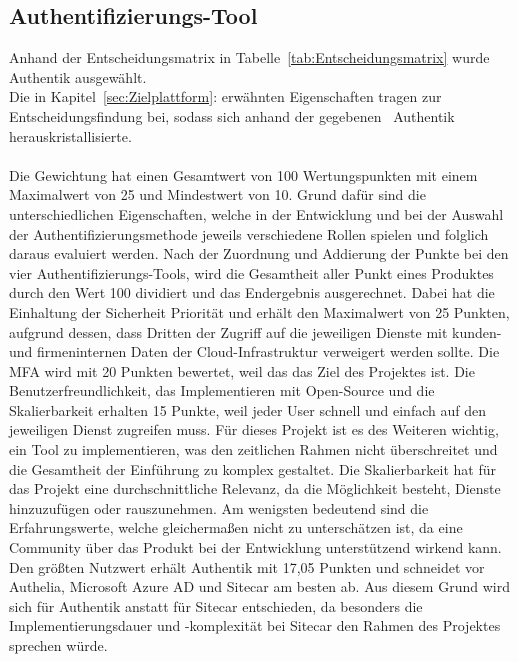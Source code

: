 \subsection{Authentifizierungs-Tool}
\label{sec:Authentifizierungs-Tool}
Anhand der Entscheidungsmatrix in Tabelle~\ref{tab:Entscheidungsmatrix} wurde Authentik ausgewählt. 
\\Die in Kapitel~\ref{sec:Zielplattform}:  erwähnten Eigenschaften tragen zur Entscheidungsfindung bei, sodass 
sich anhand der gegebenen~ Authentik herauskristallisierte.
\\
\\Die Gewichtung hat einen Gesamtwert von 100 Wertungspunkten mit einem Maximalwert von 25 und Mindestwert von 10. Grund dafür sind die 
unterschiedlichen Eigenschaften, welche in der Entwicklung und bei der Auswahl der Authentifizierungsmethode jeweils verschiedene Rollen 
spielen und folglich daraus evaluiert werden. Nach der Zuordnung und Addierung der Punkte bei den vier Authentifizierungs-Tools, 
wird die Gesamtheit aller Punkt eines Produktes durch den Wert 100 dividiert und das Endergebnis ausgerechnet. 
Dabei hat die Einhaltung der Sicherheit Priorität und erhält den Maximalwert von 25 Punkten, aufgrund dessen, dass Dritten der Zugriff 
auf die jeweiligen Dienste mit kunden- und firmeninternen Daten der Cloud-Infrastruktur verweigert werden sollte. 
Die MFA wird mit 20 Punkten bewertet, weil das das Ziel des Projektes ist. Die Benutzerfreundlichkeit, das Implementieren mit 
Open-Source und die Skalierbarkeit erhalten 15 Punkte, weil jeder User schnell und einfach auf den jeweiligen Dienst zugreifen muss. 
Für dieses Projekt ist es des Weiteren wichtig, ein Tool zu implementieren, was den zeitlichen Rahmen nicht überschreitet und die 
Gesamtheit der Einführung zu komplex gestaltet. Die Skalierbarkeit hat für das Projekt eine durchschnittliche Relevanz, da die 
Möglichkeit besteht, Dienste hinzuzufügen oder rauszunehmen. Am wenigsten bedeutend sind die Erfahrungswerte, welche 
gleichermaßen nicht zu unterschätzen ist, da eine Community über das Produkt bei der Entwicklung unterstützend wirkend kann.
\\Den größten Nutzwert erhält Authentik mit 17,05 Punkten und schneidet vor Authelia, Microsoft Azure AD und Sitecar am besten ab. 
Aus diesem Grund wird sich für Authentik anstatt für Sitecar entschieden, da besonders die Implementierungsdauer und -komplexität 
bei Sitecar den Rahmen des Projektes sprechen würde.

